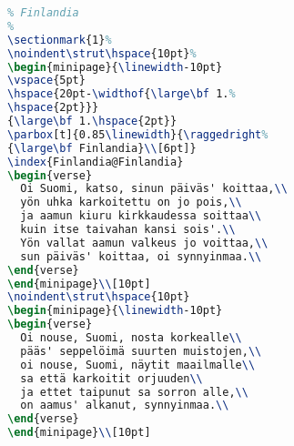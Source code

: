 \begin{lstlisting}[language=TeX]
%
% Finlandia
%
\sectionmark{1}%
\noindent\strut\hspace{10pt}%
\begin{minipage}{\linewidth-10pt}
\vspace{5pt}
\hspace{20pt-\widthof{\large\bf 1.%
\hspace{2pt}}}
{\large\bf 1.\hspace{2pt}}
\parbox[t]{0.85\linewidth}{\raggedright%
{\large\bf Finlandia}\\[6pt]}
\index{Finlandia@Finlandia}
\begin{verse}
  Oi Suomi, katso, sinun päiväs' koittaa,\\
  yön uhka karkoitettu on jo pois,\\
  ja aamun kiuru kirkkaudessa soittaa\\
  kuin itse taivahan kansi sois'.\\
  Yön vallat aamun valkeus jo voittaa,\\
  sun päiväs' koittaa, oi synnyinmaa.\\
\end{verse}
\end{minipage}\\[10pt]
\noindent\strut\hspace{10pt}
\begin{minipage}{\linewidth-10pt}
\begin{verse}
  Oi nouse, Suomi, nosta korkealle\\
  pääs' seppelöimä suurten muistojen,\\
  oi nouse, Suomi, näytit maailmalle\\
  sa että karkoitit orjuuden\\
  ja ettet taipunut sa sorron alle,\\
  on aamus' alkanut, synnyinmaa.\\
\end{verse}
\end{minipage}\\[10pt]
\end{lstlisting}
\clearpage
\headerfooteron{}
\fancyhead[CE]{\LaTeX}
